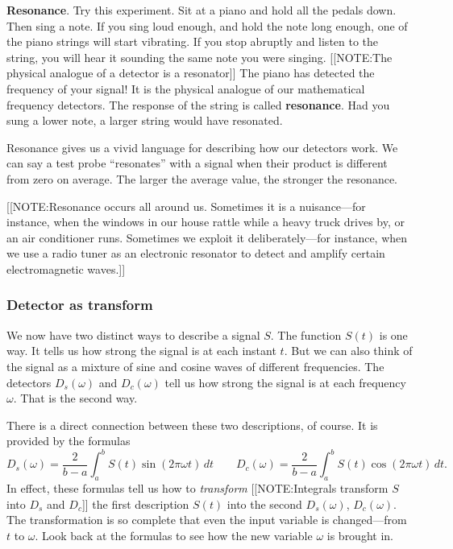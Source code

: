 {\bf Resonance}. Try this experiment.  Sit at a piano
and hold all the pedals down.  Then sing a note.  If you sing loud
enough, and hold the note long enough, one of the piano strings will
start vibrating.  If you stop abruptly and listen to the string, you
will hear it sounding the same note you were singing.
[[NOTE:The physical analogue of a detector  is a resonator]]
The piano has detected the frequency of your signal!  It is the
physical analogue of our mathematical frequency detectors.  The
response of the string is called {\bf resonance}.  Had you sung a
lower note, a larger string would have resonated.

Resonance gives us a vivid language for describing how our detectors
work.  We can say a test probe ``resonates'' with a signal when their
product is different from zero on average.  The larger the average
value, the stronger the resonance.



[[NOTE:Resonance occurs all around us.  Sometimes it is a
  nuisance---for instance, when the windows in our house rattle while
  a heavy truck drives by, or an air conditioner runs.  Sometimes we
  exploit it deliberately---for instance, when we use a radio tuner as
  an electronic resonator to detect and amplify certain
  electromagnetic waves.]]


\subsubsection{Detector as transform}
\label{subsubsec:detector-as-transform}

We now have two distinct ways to describe a signal $S$.  The function
$S(t)$ is one way.  It tells us how strong the signal is at each
instant $t$.  But we can also think of the signal as a mixture of sine
and cosine waves of different frequencies.  The detectors
$D_s(\omega)$ and $D_c(\omega)$ tell us how strong the signal is at
each frequency $\omega$.  That is the second way.

There is a direct connection between these two descriptions, of course.  It is provided by the formulas
	\[
D_s(\omega) = \dfrac{2}{b-a}
			\int_a^b S(t) \sin(2\pi\omega t)\,dt
		\qquad
	D_c(\omega) = \dfrac{2}{b-a}
			\int_a^b S(t) \cos(2\pi\omega t)\,dt.
\]
In effect, these formulas tell us how to {\em transform\/}  
[[NOTE:Integrals transform  $S$ into $D_s$ and $D_c$]]
the first description $S(t)$ into the second $D_s(\omega)$,
$D_c(\omega)$.  The transformation is so complete that even the input
variable is changed---from $t$ to $\omega$.  Look back at the formulas
to see how the new variable $\omega$ is brought in.

